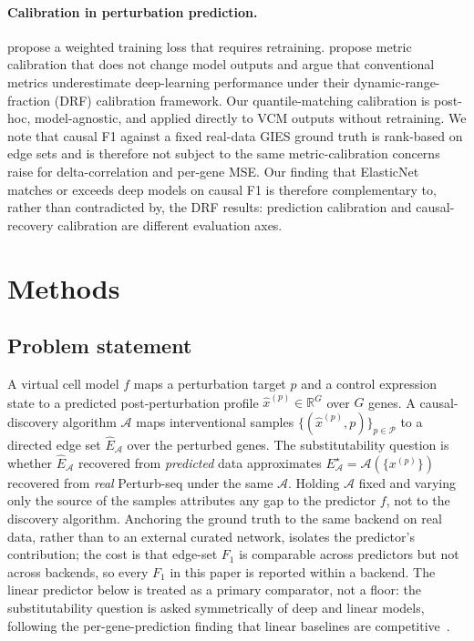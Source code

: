 \documentclass{article}
\theoremstyle{plain}
\theoremstyle{definition}
\theoremstyle{remark}
\begin{document}
\paragraph{Calibration in perturbation prediction.} \citet{mejia2025diversity} propose a weighted training loss that requires retraining. \citet{miller2025calibrated} propose metric calibration that does not change model outputs and argue that conventional metrics underestimate deep-learning performance under their dynamic-range-fraction (DRF) calibration framework. Our quantile-matching calibration is post-hoc, model-agnostic, and applied directly to VCM outputs without retraining. We note that causal F1 against a fixed real-data GIES ground truth is rank-based on edge sets and is therefore not subject to the same metric-calibration concerns \citet{miller2025calibrated} raise for delta-correlation and per-gene MSE. Our finding that ElasticNet matches or exceeds deep models on causal F1 is therefore complementary to, rather than contradicted by, the DRF results: prediction calibration and causal-recovery calibration are different evaluation axes.

\section{Methods}
\label{sec:methods}

\subsection{Problem statement}
A virtual cell model $f$ maps a perturbation target $p$ and a control expression state to a predicted post-perturbation profile $\hat{x}^{(p)}\in\mathbb{R}^{G}$ over $G$ genes. A causal-discovery algorithm $\mathcal{A}$ maps interventional samples $\{(\hat{x}^{(p)},p)\}_{p\in\mathcal{P}}$ to a directed edge set $\hat{E}_{\mathcal{A}}$ over the perturbed genes. The substitutability question is whether $\hat{E}_{\mathcal{A}}$ recovered from \emph{predicted} data approximates $E^{\star}_{\mathcal{A}}=\mathcal{A}(\{x^{(p)}\})$ recovered from \emph{real} Perturb-seq under the same $\mathcal{A}$. Holding $\mathcal{A}$ fixed and varying only the source of the samples attributes any gap to the predictor $f$, not to the discovery algorithm. Anchoring the ground truth to the same backend on real data, rather than to an external curated network, isolates the predictor's contribution; the cost is that edge-set $F_1$ is comparable across predictors but not across backends, so every $F_1$ in this paper is reported within a backend. The linear predictor below is treated as a primary comparator, not a floor: the substitutability question is asked symmetrically of deep and linear models, following the per-gene-prediction finding that linear baselines are competitive~\citep{ahlmanneltze2025}.
\end{document}
